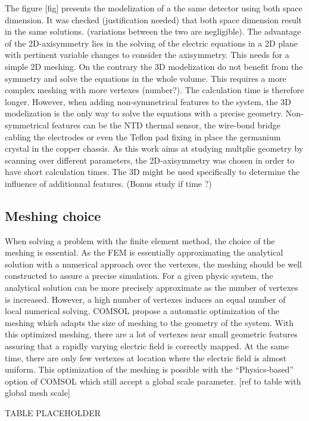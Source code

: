 The figure [fig] presents the modelization of a the same detector using both space dimension. It was checked (justification needed) that both space dimension result in the same solutions. (variations between the two are negligible). The advantage of the 2D-axisymmetry lies in the solving of the electric equations in a 2D plane with pertinent variable changes to consider the axisymmetry. This needs for a simple 2D meshing. On the contrary the 3D modelization do not benefit from the symmetry and solve the equations in the whole volume. This requires a more complex meshing with more vertexes (number?). The calculation time is therefore longer. However, when adding non-symmetrical features to the system, the 3D modelization is the only way to solve the equations with a precise geometry. Non-symmetrical features can be the NTD thermal sensor, the wire-bond bridge cabling the electrodes or even the Teflon pad fixing in place the germanium crystal in the copper chassis.
As this work aims at studying multplie geometry by scanning over different parameters, the 2D-axisymmetry was chosen in order to have short calculation times. The 3D might be used specifically to determine the influence of additionnal features. (Bonus study if time ?)


\subsection{Meshing choice}

When solving a problem with the finite element method, the choice of the meshing is essential. As the FEM is essentially approximating the analytical solution with a numerical approach over the vertexes, the meshing should be well constructed to assure a precise simulation. For a given physic system, the analytical solution can be more precisely approximate as the number of vertexes is increased. However, a high number of vertexes induces an equal number of local numerical solving. COMSOL propose a automatic optimization of the meshing which adapts the size of meshing to the geometry of the system. With this optimized meshing, there are a lot of vertexes near small geometric features assuring that a rapidly varying electric field is correctly mapped. At the same time, there are only few vertexes at location where the electric field is almost uniform. This optimization of the meshing is possible with the “Physics-based” option of COMSOL which still accept a global scale parameter. [ref to table with global mesh scale]

{\color{red}TABLE PLACEHOLDER}

